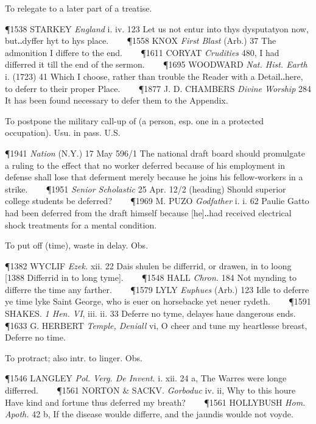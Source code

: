 \begin{description}[wide, labelwidth=!, labelindent=0pt]
\begin{myenumerate}
 To relegate to a later part of a treatise.

\P 1538 STARKEY  \textit{England} i. iv. 123 Let us not entur into thys dysputatyon now, but‥dyffer hyt to hys place.    
\P 1558 KNOX  \textit{First Blast} (Arb.) 37 The admonition I differe to the end.    
\P 1611 CORYAT  \textit{Crudities} 480, I had differred it till the end of the sermon.    
\P 1695 WOODWARD  \textit{Nat. Hist. Earth} i. (1723) 41 Which I choose, rather than trouble the Reader with a Detail‥here, to deferr to their proper Place.    
\P 1877 J. D. CHAMBERS  \textit{Divine Worship} 284 It has been found necessary to defer them to the Appendix.

 To postpone the military call-up of (a person, esp. one in a protected occupation). Usu. in pass. U.S.

\P 1941 \textit{Nation}  (N.Y.) 17 May 596/1 The national draft board should promulgate a ruling to the effect that no worker deferred because of his employment in defense shall lose that deferment merely because he joins his fellow-workers in a strike.    
\P 1951 \textit{Senior  Scholastic} 25 Apr. 12/2 (heading) Should superior college students be deferred?    
\P 1969 M. PUZO  \textit{Godfather} i. i. 62 Paulie Gatto had been deferred from the draft himself because [he]‥had received electrical shock treatments for a mental condition.

 To put off (time), waste in delay. Obs.

\P 1382 WYCLIF  \textit{Ezek.} xii. 22 Dais shulen be differrid, or drawen, in to loong [1388 Differrid in  to long tyme].    
\P 1548 HALL  \textit{Chron.} 184 Not mynding to differre the time any farther.    
\P 1579 LYLY  \textit{Euphues} (Arb.) 123 Idle to deferre ye time lyke Saint George, who is euer on horsebacke yet neuer rydeth.    
\P 1591 SHAKES.  \textit{1 Hen. VI}, iii. ii. 33 Deferre no tyme, delayes haue dangerous ends.    
\P 1633 G. HERBERT  \textit{Temple, Deniall} vi, O cheer and tune my heartlesse breast, Deferre no time.

 To protract; also intr. to linger. Obs.

\P 1546 LANGLEY  \textit{Pol. Verg. De Invent.} i. xii. 24 a, The Warres were longe differred.    
\P 1561 NORTON \& SACKV.  \textit{Gorboduc} iv. ii, Why to this houre Have kind and fortune thus deferred my breath?    
\P 1561 HOLLYBUSH  \textit{Hom. Apoth.} 42 b, If the disease woulde differre, and the jaundis woulde not voyde.
\end{myenumerate}


\end{description}
